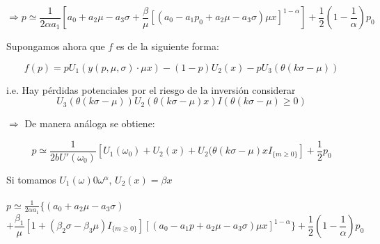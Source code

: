 \[\Rightarrow p\simeq \frac{1}{2\alpha a_1}[a_0+a_2\mu-a_3\sigma+\frac{\beta}{\mu}[(a_0-a_1p_0+a_2\mu-a_3\sigma)\mu x]^{1-\alpha}]+\frac{1}{2}(1-\frac{1}{\alpha})p_0\]
 
Supongamos ahora que $f$ es de la siguiente forma:

\[f(p)=pU_1(y(p,\mu,\sigma)\cdot \mu x)-(1-p)U_2(x)-pU_3(\theta(k\sigma-\mu))\]
 
i.e. Hay pérdidas potenciales por el riesgo de la inversión considerar
\[U_3(\theta(k\sigma-\mu))U_2(\theta(k\sigma-\mu)x)I(\theta(k\sigma-\mu)\ge 0)\]
 
$\Rightarrow$ De manera análoga se obtiene:

\[p\simeq\frac{1}{2bU'(\omega_0)}[U_1(\omega_0)+U_2(x)+U_2(\theta(k\sigma-\mu)xI_{\{m\ge0\}}]+\frac{1}{2}p_0\]
 
\newpage 
Si tomamos $U_1(\omega)0\omega^\alpha$, $U_2(x)=\beta x$ \\\\
 
$p\simeq \frac{1}{2\alpha a_1}\{(a_0+a_2\mu-a_3\sigma)$
\[+\frac{\beta_1}{\mu}[1+(\beta_2\sigma-\beta_3 \mu)I_{\{m\ge0\}}][(a_0-a_1p+a_2\mu-a_3\sigma)\mu x]^{1-\alpha}\}+\frac{1}{2}(1-\frac{1}{\alpha})p_0\] 



